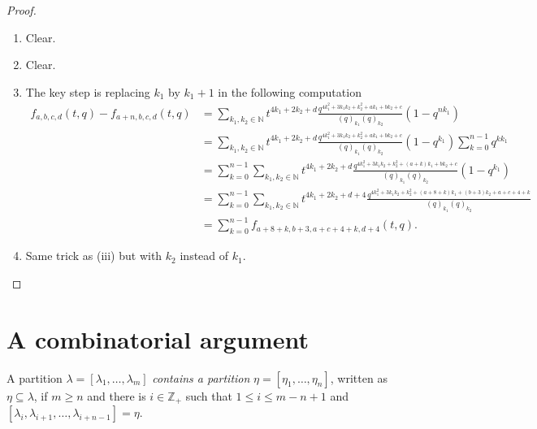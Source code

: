 \documentclass[a4paper, 12pt, reqno]{amsart}
\theoremstyle{remark}
\begin{document}
\begin{proof}\leavevmode
  \begin{enumerate}
  \item Clear.
  \item Clear.
  \item The key step is replacing $k_1$ by $k_1 + 1$ in the following computation
    \begin{align*}
      f_{a, b, c, d}(t, q) - f_{a + n, b, c, d}(t, q) &= \sum_{k_1, k_2 \in \mathbb{N}}t^{4k_1 + 2k_2 + d}\frac{q^{4k_1^2 + 3k_1k_2 + k_2^2 + ak_1 + bk_2 + c}}{(q)_{k_1}(q)_{k_2}}(1 - q^{nk_1}) \\
                                                      &= \sum_{k_1, k_2 \in \mathbb{N}}t^{4k_1 + 2k_2 + d}\frac{q^{4k_1^2 + 3k_1k_2 + k_2^2 + ak_1 + bk_2 + c}}{(q)_{k_1}(q)_{k_2}}(1 - q^{k_1})\sum_{k = 0}^{n - 1}q^{kk_1} \\
                                                      &= \sum_{k = 0}^{n - 1}\sum_{k_1, k_2 \in \mathbb{N}}t^{4k_1 + 2k_2 + d}\frac{q^{4k_1^2 + 3k_1k_2 + k_2^2 + (a + k)k_1 + bk_2 + c}}{(q)_{k_1}(q)_{k_2}}(1 - q^{k_1}) \\
                                                      &= \sum_{k = 0}^{n - 1}\sum_{k_1, k_2 \in \mathbb{N}}t^{4k_1 + 2k_2 + d + 4}\frac{q^{4k_1^2 + 3k_1k_2 + k_2^2 + (a + 8 + k)k_1 + (b + 3)k_2 + a + c + 4 + k}}{(q)_{k_1}(q)_{k_2}} \\
                                                      &= \sum_{k = 0}^{n - 1}f_{a + 8 + k, b + 3, a + c + 4 + k, d + 4}(t, q).
    \end{align*}
  \item Same trick as (iii) but with $k_2$ instead of $k_1$. \qedhere
  \end{enumerate}
\end{proof}

\section{A combinatorial argument}
\label{sec:comb-argum}

A partition $\lambda = [\lambda_1, \dots, \lambda_m]$ \emph{contains a partition} $\eta = [\eta_1, \dots, \eta_n]$, written as $\eta \subseteq \lambda$, if $m \ge n$ and there is $i \in \mathbb{Z}_+$ such that $1 \le i \le m - n + 1$ and $[\lambda_i, \lambda_{i + 1}, \dots, \lambda_{i + n - 1}] = \eta$.
\end{document}
